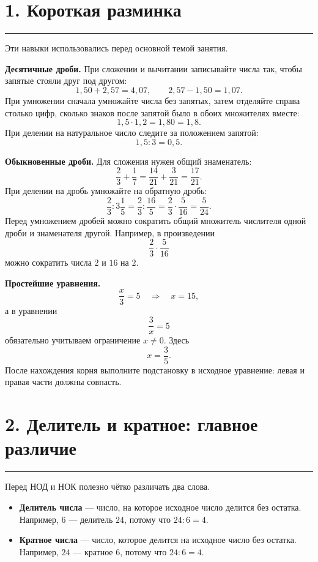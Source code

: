 \documentclass[a4paper,12pt]{article}
\newcommand{\sectionline}{%
  \vspace{-0.2em}\par\noindent
  {\color{accent}\rule{\linewidth}{0.55pt}}%
  \vspace{0.35em}
}
\newcommand{\keyidea}[1]{%
  \par\noindent{\color{darkaccent}\bfseries #1}\par
}
\begin{document}
\section*{1. Короткая разминка}
\sectionline

Эти навыки использовались перед основной темой занятия.

\textbf{Десятичные дроби.}
При сложении и вычитании записывайте числа так, чтобы запятые стояли друг под другом:
\[
1{,}50+2{,}57=4{,}07,
\qquad
2{,}57-1{,}50=1{,}07.
\]
При умножении сначала умножайте числа без запятых, затем отделяйте справа столько цифр,
сколько знаков после запятой было в обоих множителях вместе:
\[
1{,}5\cdot1{,}2=1{,}80=1{,}8.
\]
При делении на натуральное число следите за положением запятой:
\[
1{,}5:3=0{,}5.
\]

\textbf{Обыкновенные дроби.}
Для сложения нужен общий знаменатель:
\[
\frac23+\frac17=\frac{14}{21}+\frac3{21}=\frac{17}{21}.
\]
При делении на дробь умножайте на обратную дробь:
\[
\frac23:3\frac15
=\frac23:\frac{16}{5}
=\frac23\cdot\frac5{16}
=\frac5{24}.
\]
Перед умножением дробей можно сократить общий множитель числителя одной дроби и знаменателя другой. Например, в произведении
\[
\frac23\cdot\frac5{16}
\]
можно сократить числа \(2\) и \(16\) на \(2\).

\textbf{Простейшие уравнения.}
\[
\frac{x}{3}=5 \quad\Rightarrow\quad x=15,
\]
а в уравнении
\[
\frac3x=5
\]
обязательно учитываем ограничение \(x\ne0\). Здесь
\[
x=\frac35.
\]
После нахождения корня выполните подстановку в исходное уравнение: левая и правая части должны совпасть.

\section*{2. Делитель и кратное: главное различие}
\sectionline

Перед НОД и НОК полезно чётко различать два слова.

\begin{itemize}[leftmargin=7mm,itemsep=3pt,topsep=2pt]
\item \textbf{Делитель числа} --- число, на которое исходное число делится без остатка. Например, \(6\) --- делитель \(24\), потому что \(24:6=4\).
\item \textbf{Кратное числа} --- число, которое делится на исходное число без остатка. Например, \(24\) --- кратное \(6\), потому что \(24:6=4\).
\end{itemize}

\keyidea{Короткая опора}
\end{document}
